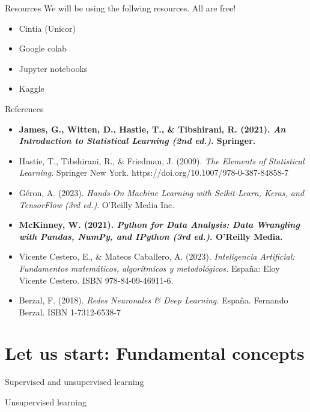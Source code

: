 \documentclass[
  ignorenonframetext,
]{beamer}
\providecommand{\tightlist}{%
  \setlength{\itemsep}{0pt}\setlength{\parskip}{0pt}}\usepackage{longtable,booktabs,array}
\begin{document}
\begin{frame}{Resources}
\protect\hypertarget{resources}{}
We will be using the follwing resources. All are free!

\begin{itemize}
\tightlist
\item
  Cintia (Unicor)
\item
  Google colab
\item
  Jupyter notebooks
\item
  Kaggle
\end{itemize}
\end{frame}

\begin{frame}{References}
\protect\hypertarget{references}{}
\fontsize{10pt}{5.2}\selectfont

\begin{itemize}
\item
  \textbf{James, G., Witten, D., Hastie, T., \& Tibshirani, R. (2021).
  \emph{An Introduction to Statistical Learning (2nd ed.)}. Springer.}
\item
  Hastie, T., Tibshirani, R., \& Friedman, J. (2009). \emph{The Elements
  of Statistical Learning}. Springer New York.
  https://doi.org/10.1007/978-0-387-84858-7
\item
  Géron, A. (2023). \emph{Hands-On Machine Learning with Scikit-Learn,
  Keras, and TensorFlow (3rd ed.)}. O'Reilly Media Inc.
\item
  \textbf{McKinney, W. (2021). \emph{Python for Data Analysis: Data
  Wrangling with Pandas, NumPy, and IPython (3rd ed.)}. O'Reilly Media.}
\item
  Vicente Cestero, E., \& Mateos Caballero, A. (2023).
  \emph{Inteligencia Artificial: Fundamentos matemáticos, algorítmicos y
  metodológicos.} España: Eloy Vicente Cestero. ISBN 978-84-09-46911-6.
\item
  Berzal, F. (2018). \emph{Redes Neuronales \& Deep Learning.} España.
  Fernando Berzal. ISBN 1-7312-6538-7
\end{itemize}
\end{frame}

\hypertarget{let-us-start-fundamental-concepts}{%
\section{Let us start: Fundamental
concepts}\label{let-us-start-fundamental-concepts}}

\begin{frame}{Supervised and unsupervised learning}
\protect\hypertarget{supervised-and-unsupervised-learning}{}
\end{frame}

\begin{frame}{Unsupervised learning}
\protect\hypertarget{unsupervised-learning}{}
\end{frame}
\end{document}
